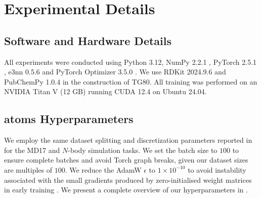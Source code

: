 \section{Experimental Details}
\subsection{Software and Hardware Details}
All experiments were conducted using Python 3.12, NumPy 2.2.1 \cite{harris_array_2020}, PyTorch 2.5.1 \cite{paszke_pytorch_2019}, e3nn 0.5.6 \cite{geiger_e3nn_2022} and PyTorch Optimizer 3.5.0 \cite{kim_pytorch_optimizer_2021}. We use RDKit 2024.9.6 \cite{greg_landrum_rdkit_2012} and PubChemPy 1.0.4 in the construction of TG80. All training was performed on an NVIDIA Titan V (12 GB) running CUDA 12.4 on Ubuntu 24.04.

\subsection{\gls{atoms} Hyperparameters}
\label{sec:my_hyperparams}
We employ the same dataset splitting and discretization parameters reported in \textcite{xu_equivariant_2024} for the MD17 and \(N\)-body simulation tasks. We set the batch size to \(100\) to ensure complete batches and avoid Torch graph breaks, given our dataset sizes are multiples of \(100\). We reduce the AdamW \(\epsilon\) to \(1\times10^{-10}\) to avoid instability associated with the small gradients produced by zero-initialised weight matrices in early training \cite{jordan_nanogpt_2025}. We present a complete overview of our hyperparameters in .

